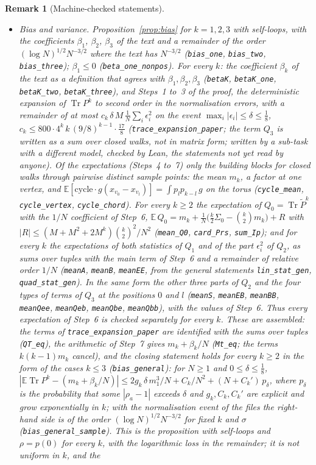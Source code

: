 \documentclass[11pt,a4paper]{article}
\theoremstyle{stmt}
\theoremstyle{defn}
\theoremstyle{rmk}
\newtheorem{remark}[theorem]{Remark}
\numberwithin{equation}{section}
\DeclareMathOperator{\Tr}{Tr}
\begin{document}
{\begin{remark}[Machine-checked statements]
\begin{itemize}
\item \emph{Bias and variance.} Proposition~\ref{prop:bias} for $k=1,2,3$ with self-loops, with the coefficients $\beta_1$, $\beta_2$, $\beta_3$ of the text and a remainder of the order $(\log N)^{1/2}N^{-3/2}$ where the text has $N^{-3/2}$ (\texttt{bias\_one}, \texttt{bias\_two}, \texttt{bias\_three}); $\beta_1\le0$ (\texttt{beta\_one\_nonpos}). For every $k$: the coefficient $\beta_k$ of the text as a definition that agrees with $\beta_1,\beta_2,\beta_3$ (\texttt{betaK}, \texttt{betaK\_one}, \texttt{betaK\_two}, \texttt{betaK\_three}), and Steps~1 to~3 of the proof, the deterministic expansion of $\Tr P^k$ to second order in the normalisation errors, with a remainder of at most $c_k\,\delta\,M\,\frac1N\sum_i\epsilon_i^2$ on the event $\max_i|\epsilon_i|\le\delta\le\frac18$, $c_k\le800\cdot4^k\,k\,(9/8)^{k-1}\cdot\frac{17}{8}$ (\texttt{trace\_expansion\_paper}; the term $Q_3$ is written as a sum over closed walks, not in matrix form; written by a sub-task with a different model, checked by Lean, the statements not yet read by anyone). Of the expectations (Steps~4 to~7) only the building blocks for closed walks through pairwise distinct sample points: the mean $m_k$, a factor at one vertex, and $\mathbb E[\text{cycle}\cdot g(x_{v_0}-x_{v_l})]=\int p_lp_{k-l}\,g$ on the torus (\texttt{cycle\_mean}, \texttt{cycle\_vertex}, \texttt{cycle\_chord}). For every $k\ge2$ the expectation of $Q_0=\Tr\tilde P^k$ with the $1/N$ coefficient of Step~6, $\mathbb E\,Q_0=m_k+\frac1N\big(\frac k2\Sigma_0-\binom k2m_k\big)+R$ with $|R|\le(M+M^2+2M^k)\binom k2^2/N^2$ (\texttt{mean\_Q0}, \texttt{card\_Prs}, \texttt{sum\_Ip}); and for every $k$ the expectations of both statistics of $Q_1$ and of the part $\epsilon_i^2$ of $Q_2$, as sums over tuples with the main term of Step~6 and a remainder of relative order $1/N$ (\texttt{meanA}, \texttt{meanB}, \texttt{meanEE}, from the general statements \texttt{lin\_stat\_gen}, \texttt{quad\_stat\_gen}). In the same form the other three parts of $Q_2$ and the four types of terms of $Q_3$ at the positions $0$ and $l$ (\texttt{meanS}, \texttt{meanEB}, \texttt{meanBB}, \texttt{meanQee}, \texttt{meanQeb}, \texttt{meanQbe}, \texttt{meanQbb}), with the values of Step~6. Thus every expectation of Step~6 is checked separately for every $k$. These are assembled: the terms of \texttt{trace\_expansion\_paper} are identified with the sums over tuples (\texttt{QT\_eq}), the arithmetic of Step~7 gives $m_k+\beta_k/N$ (\texttt{Mt\_eq}; the terms $k(k-1)m_k$ cancel), and the closing statement holds for every $k\ge2$ in the form of the cases $k\le3$ (\texttt{bias\_general}): for $N\ge1$ and $0\le\delta\le\frac18$, $|\mathbb E\Tr P^k-(m_k+\beta_k/N)|\le2g_k\,\delta\,m_1^3/N+C_k/N^2+(N+C_k')\,p_\delta$, where $p_\delta$ is the probability that some $|\rho_a-1|$ exceeds $\delta$ and $g_k,C_k,C_k'$ are explicit and grow exponentially in $k$; with the normalisation event of the files the right-hand side is of the order $(\log N)^{1/2}N^{-3/2}$ for fixed $k$ and $\sigma$ (\texttt{bias\_general\_sample}). This is the proposition with self-loops and $\rho=p(0)$ for every $k$, with the logarithmic loss in the remainder; it is not uniform in $k$, and the 
\end{itemize}
\end{remark}}
\end{document}
